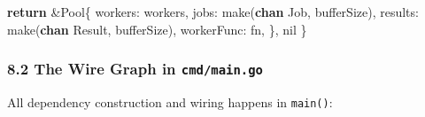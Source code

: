 \documentclass[
]{article}
\newenvironment{Shaded}{}{}
\newcommand{\BuiltInTok}[1]{\textcolor[rgb]{0.00,0.50,0.00}{#1}}
\newcommand{\ControlFlowTok}[1]{\textcolor[rgb]{0.00,0.44,0.13}{\textbf{#1}}}
\newcommand{\KeywordTok}[1]{\textcolor[rgb]{0.00,0.44,0.13}{\textbf{#1}}}
\newcommand{\NormalTok}[1]{#1}
\newcommand{\OperatorTok}[1]{\textcolor[rgb]{0.40,0.40,0.40}{#1}}
\newcommand{\OtherTok}[1]{\textcolor[rgb]{0.00,0.44,0.13}{#1}}
\begin{document}
\begin{Shaded}
\begin{Highlighting}[]
    \ControlFlowTok{return} \OperatorTok{\&}\NormalTok{Pool}\OperatorTok{\{}
\NormalTok{        workers}\OperatorTok{:}\NormalTok{    workers}\OperatorTok{,}
\NormalTok{        jobs}\OperatorTok{:}       \BuiltInTok{make}\OperatorTok{(}\KeywordTok{chan}\NormalTok{ Job}\OperatorTok{,}\NormalTok{ bufferSize}\OperatorTok{),}
\NormalTok{        results}\OperatorTok{:}    \BuiltInTok{make}\OperatorTok{(}\KeywordTok{chan}\NormalTok{ Result}\OperatorTok{,}\NormalTok{ bufferSize}\OperatorTok{),}
\NormalTok{        workerFunc}\OperatorTok{:}\NormalTok{ fn}\OperatorTok{,}
    \OperatorTok{\},} \OtherTok{nil}
\OperatorTok{\}}
\end{Highlighting}
\end{Shaded}

\hypertarget{the-wire-graph-in-cmdmain.go}{%
\subsubsection{\texorpdfstring{8.2 The Wire Graph in
\texttt{cmd/main.go}}{8.2 The Wire Graph in cmd/main.go}}\label{the-wire-graph-in-cmdmain.go}}

All dependency construction and wiring happens in \texttt{main()}:
\end{document}
